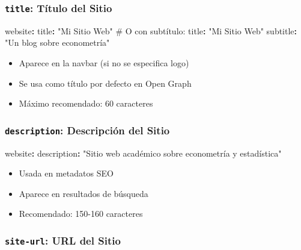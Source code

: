 \documentclass[
  doc,
  floatsintext,
  longtable,
  a4paper,
  nolmodern,
  notxfonts,
  notimes,
  12pt,
  colorlinks=true,linkcolor=blue,citecolor=blue,urlcolor=blue]{apa7}
\newenvironment{Shaded}{\begin{snugshade}}{\end{snugshade}}
\newcommand{\AttributeTok}[1]{\textcolor[rgb]{0.40,0.45,0.13}{#1}}
\newcommand{\CommentTok}[1]{\textcolor[rgb]{0.37,0.37,0.37}{#1}}
\newcommand{\FunctionTok}[1]{\textcolor[rgb]{0.28,0.35,0.67}{#1}}
\newcommand{\KeywordTok}[1]{\textcolor[rgb]{0.00,0.23,0.31}{\textbf{#1}}}
\newcommand{\StringTok}[1]{\textcolor[rgb]{0.13,0.47,0.30}{#1}}
\providecommand{\tightlist}{%
  \setlength{\itemsep}{0pt}\setlength{\parskip}{0pt}}
\begin{document}
\subsubsection{\texorpdfstring{\texttt{title}: Título del
Sitio}{title: Título del Sitio}}\label{title-tuxedtulo-del-sitio}

\begin{Shaded}
\begin{Highlighting}[]
\FunctionTok{website}\KeywordTok{:}
\AttributeTok{  }\FunctionTok{title}\KeywordTok{:}\AttributeTok{ }\StringTok{"Mi Sitio Web"}
\CommentTok{  \# O con subtítulo:}
\AttributeTok{  }\FunctionTok{title}\KeywordTok{:}\AttributeTok{ }\StringTok{"Mi Sitio Web"}
\AttributeTok{  }\FunctionTok{subtitle}\KeywordTok{:}\AttributeTok{ }\StringTok{"Un blog sobre econometría"}
\end{Highlighting}
\end{Shaded}

\begin{itemize}
\tightlist
\item
  Aparece en la navbar (si no se especifica logo)
\item
  Se usa como título por defecto en Open Graph
\item
  Máximo recomendado: 60 caracteres
\end{itemize}

\subsubsection{\texorpdfstring{\texttt{description}: Descripción del
Sitio}{description: Descripción del Sitio}}\label{description-descripciuxf3n-del-sitio}

\begin{Shaded}
\begin{Highlighting}[]
\FunctionTok{website}\KeywordTok{:}
\AttributeTok{  }\FunctionTok{description}\KeywordTok{:}\AttributeTok{ }\StringTok{"Sitio web académico sobre econometría y estadística"}
\end{Highlighting}
\end{Shaded}

\begin{itemize}
\tightlist
\item
  Usada en metadatos SEO
\item
  Aparece en resultados de búsqueda
\item
  Recomendado: 150-160 caracteres
\end{itemize}

\subsubsection{\texorpdfstring{\texttt{site-url}: URL del
Sitio}{site-url: URL del Sitio}}\label{site-url-url-del-sitio}
\end{document}
